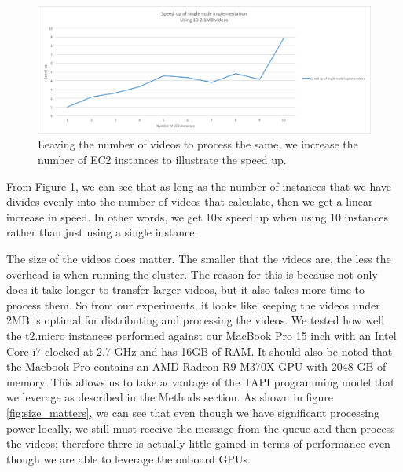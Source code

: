 \begin{figure}[h]
  \label{fig:speed_up}
  \centering
  \includegraphics[width=\textwidth]{figures/speed_up}
  \caption{Leaving the number of videos to process the same, we increase the
  number of EC2 instances to illustrate the speed up.}
\end{figure}

From Figure \ref{fig:speed_up}, we can see that as long as the number of instances
that we have divides evenly into the number of videos that calculate, then we
get a linear increase in speed. In other words, we get 10x speed up when using
10 instances rather than just using a single instance.

The size of the videos does matter. The smaller that the videos are, the less
the overhead is when running the cluster. The reason for this is because not only
does it take longer to transfer larger videos, but it also takes more time to process
them. So from our experiments, it looks like keeping the videos under 2MB is optimal
for distributing and processing the videos.
We tested how well the t2.micro instances performed against our MacBook Pro 15 inch
with an Intel Core i7 clocked at 2.7 GHz and has 16GB of RAM. It should also be
noted that the Macbook Pro contains an AMD Radeon R9 M370X GPU with 2048 GB of
memory. This allows us to take advantage of the TAPI programming model that
we leverage as described in the Methods section.  As shown in figure \ref{fig:size_matters},
we can see that even though we have significant processing power locally, we still
must receive the message from the queue and then process the videos; therefore
there is actually little gained in terms of performance even though we are able
to leverage the onboard GPUs.


